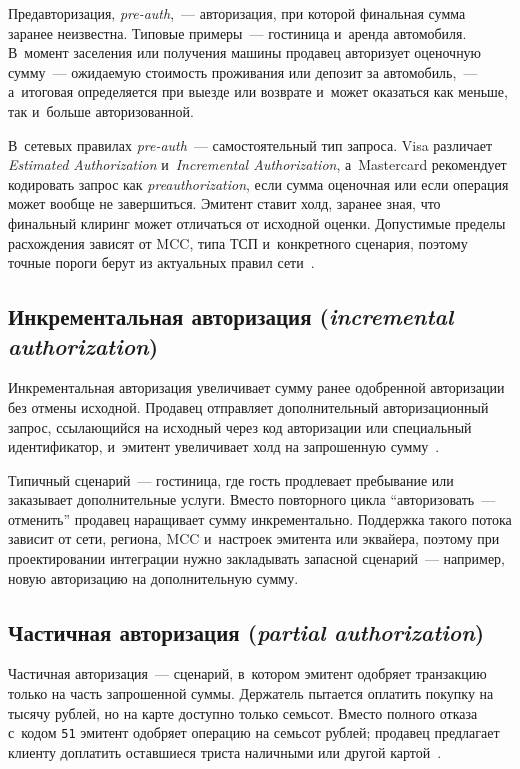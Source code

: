 Предавторизация, \textit{pre-auth},~--- авторизация, при которой финальная
сумма заранее неизвестна. Типовые примеры~--- гостиница и~аренда
автомобиля. В~момент заселения или получения машины продавец авторизует
оценочную сумму~--- ожидаемую стоимость проживания или депозит за
автомобиль,~--- а~итоговая определяется при выезде или возврате и~может
оказаться как меньше, так и~больше авторизованной.

В~сетевых правилах \textit{pre-auth}~--- самостоятельный тип запроса. Visa
различает \textit{Estimated Authorization} и~\textit{Incremental Authorization},
а~Mastercard рекомендует кодировать запрос как \textit{preauthorization}, если сумма
оценочная или если операция может вообще не завершиться. Эмитент ставит холд,
заранее зная, что финальный клиринг может отличаться от исходной оценки.
Допустимые пределы расхождения зависят от MCC, типа ТСП и~конкретного сценария,
поэтому точные пороги берут из актуальных правил
сети~\cite{visa-tadg,visa-core-rules,mc-tpr}.

\subsection*{Инкрементальная авторизация (\textit{incremental authorization})}

Инкрементальная авторизация увеличивает сумму ранее одобренной авторизации без
отмены исходной. Продавец отправляет дополнительный авторизационный запрос,
ссылающийся на исходный через код авторизации или специальный идентификатор,
и~эмитент увеличивает холд на запрошенную
сумму~\cite{visa-tadg,visa-core-rules,mc-tpr}.

Типичный сценарий~--- гостиница, где гость продлевает пребывание или заказывает
дополнительные услуги. Вместо повторного цикла \enquote{авторизовать~---
отменить} продавец наращивает сумму инкрементально. Поддержка такого потока
зависит от сети, региона, MCC и~настроек эмитента или эквайера, поэтому при
проектировании интеграции нужно закладывать запасной сценарий~--- например,
новую авторизацию на дополнительную сумму.

\subsection*{Частичная авторизация (\textit{partial authorization})}

Частичная авторизация~--- сценарий, в~котором эмитент одобряет транзакцию
только на часть запрошенной суммы. Держатель пытается оплатить покупку на
тысячу рублей, но на карте доступно только семьсот. Вместо полного отказа
с~кодом \texttt{51} эмитент одобряет операцию на семьсот рублей; продавец
предлагает клиенту доплатить оставшиеся триста наличными или другой
картой~\cite{visa-tadg,mc-tpr}.

